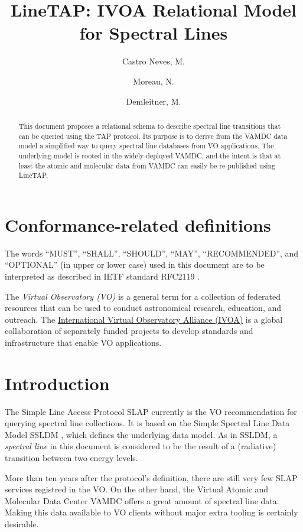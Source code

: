 \documentclass[11pt,a4paper]{ivoa}
\title{LineTAP: IVOA Relational Model for Spectral Lines}
\author{Castro Neves, M.}
\author{Moreau, N.}
\author{Demleitner, M.}
\begin{document}
\begin{abstract}

This document proposes a relational schema to describe spectral line
transitions that can be queried using the TAP protocol. Its purpose is
to derive from the VAMDC data model a simplified way to query
spectral line databases from VO applications. The underlying model is
rooted in the widely-deployed VAMDC, and the intent is that at least the
atomic and molecular data from VAMDC can easily be re-published using
LineTAP.


\end{abstract}




\section*{Conformance-related definitions}

The words ``MUST'', ``SHALL'', ``SHOULD'', ``MAY'', ``RECOMMENDED'', and
``OPTIONAL'' (in upper or lower case) used in this document are to be
interpreted as described in IETF standard RFC2119 \citep{std:RFC2119}.

The \emph{Virtual Observatory (VO)} is a
general term for a collection of federated resources that can be used
to conduct astronomical research, education, and outreach.
The \href{http://www.ivoa.net}{International
Virtual Observatory Alliance (IVOA)} is a global
collaboration of separately funded projects to develop standards and
infrastructure that enable VO applications.


\section{Introduction}

The Simple Line Access Protocol SLAP \citep{2010ivoa.specQ1209O}
currently is the VO
recommendation for querying spectral line collections.
It is based on the Simple Spectral Line Data
Model SSLDM \citep{2010ivoa.spec.1209O}, which defines the underlying
data model.
As  in SSLDM, a \emph{spectral line} in this document is considered to
be the result of a (radiative) transition between two energy levels.

More than ten years after the protocol's definition, there are still
very few SLAP services registred in the VO.
On the other hand, the Virtual Atomic and Molecular Data Center
VAMDC \citep{atoms8040076} offers a great amount of spectral line
data.  Making this data available to VO clients without major extra
tooling is certainly desirable.
\end{document}
